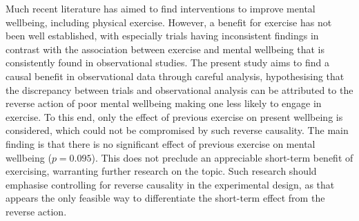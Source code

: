 Much recent literature has aimed to find interventions to improve mental wellbeing, including physical exercise.
However, a benefit for exercise has not been well established, with especially trials having inconsistent findings
in contrast with the association between exercise and mental wellbeing that is consistently found in observational
studies.
The present study aims to find a causal benefit in observational data through careful analysis, hypothesising that
the discrepancy between trials and observational analysis can be attributed to the reverse action of poor
mental wellbeing making one less likely to engage in exercise.
To this end, only the effect of previous exercise on present wellbeing is considered, which could not be compromised
by such reverse causality.
The main finding is that there is no significant effect of previous exercise on mental wellbeing ($p = 0.095$).
This does not preclude an appreciable short-term benefit of exercising, warranting further research on the topic.
Such research should emphasise controlling for reverse causality in the experimental design, as that appears
the only feasible way to differentiate the short-term effect from the reverse action.
